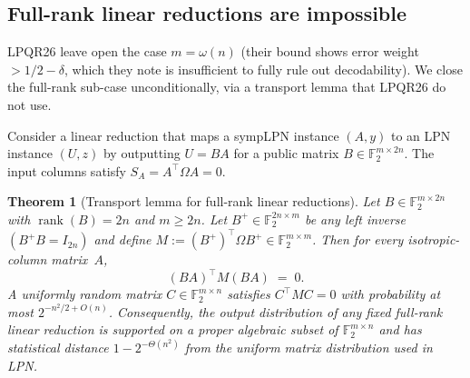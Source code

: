 \documentclass[11pt,a4paper]{article}
\theoremstyle{plain}
\newtheorem{theorem}{Theorem}[section]
\theoremstyle{definition}
\newcommand{\F}{\mathbb{F}}
\begin{document}
\subsection{Full-rank linear reductions are impossible}
\label{subsec:full-rank-linear}

LPQR26 leave open the case $m=\omega(n)$ (their bound shows error weight $>1/2-\delta$, which they note is insufficient to fully rule out decodability). We close the full-rank sub-case unconditionally, via a transport lemma that LPQR26 do not use.

Consider a linear reduction that maps a sympLPN instance $(A, y)$ to an LPN instance $(U, z)$ by outputting $U = BA$ for a public matrix $B \in \F_2^{m \times 2n}$. The input columns satisfy $S_A = A^{\top}\Omega A = 0$.

\begin{theorem}[Transport lemma for full-rank linear reductions]
\label{thm:transport-fullrank}
Let $B \in \F_2^{m \times 2n}$ with $\operatorname{rank}(B) = 2n$ and $m \ge 2n$. Let $B^{+} \in \F_2^{2n \times m}$ be any left inverse $(B^{+}B = I_{2n})$ and define $M := (B^{+})^{\top}\Omega B^{+} \in \F_2^{m \times m}$. Then for every isotropic-column matrix~$A$,
\[
(BA)^{\top} M (BA) \;=\; 0.
\]
A uniformly random matrix $C \in \F_2^{m \times n}$ satisfies $C^{\top} M C = 0$ with probability at most $2^{-n^2/2 + O(n)}$. Consequently, the output distribution of any fixed full-rank linear reduction is supported on a proper algebraic subset of $\F_2^{m \times n}$ and has statistical distance $1 - 2^{-\Theta(n^2)}$ from the uniform matrix distribution used in LPN.
\end{theorem}
\end{document}
